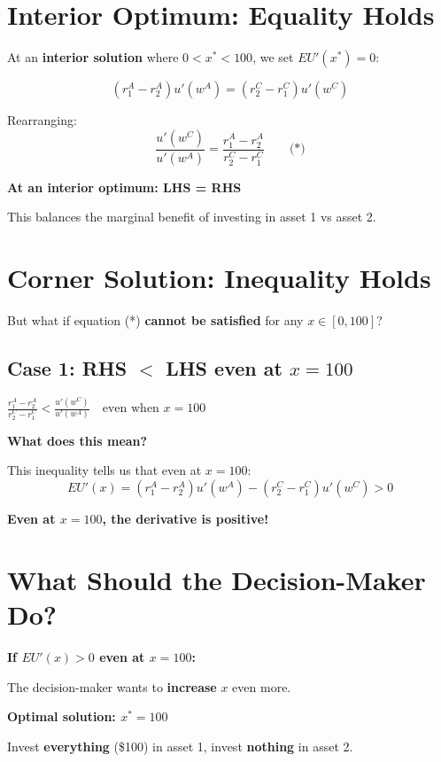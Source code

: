 \documentclass[12pt]{article}
\begin{document}
\section*{Interior Optimum: Equality Holds}

At an \textbf{interior solution} where $0 < x^* < 100$, we set $EU'(x^*) = 0$:

$$(r_1^A - r_2^A)u'(w^A) = (r_2^C - r_1^C)u'(w^C)$$

Rearranging:
$$\frac{u'(w^C)}{u'(w^A)} = \frac{r_1^A - r_2^A}{r_2^C - r_1^C} \qquad \text{(*)}$$

\begin{center}
\colorbox{green!20}{
\begin{minipage}{0.9\textwidth}
\textbf{At an interior optimum: LHS = RHS}

This balances the marginal benefit of investing in asset 1 vs asset 2.
\end{minipage}
}
\end{center}

\section*{Corner Solution: Inequality Holds}

But what if equation (*) \textbf{cannot be satisfied} for any $x \in [0, 100]$?

\subsection*{Case 1: RHS $<$ LHS even at $x = 100$}

\begin{center}
\colorbox{red!20}{\Large
$\displaystyle\frac{r_1^A - r_2^A}{r_2^C - r_1^C} < \frac{u'(w^C)}{u'(w^A)} \quad \text{even when } x = 100$
}
\end{center}

\textbf{What does this mean?}

This inequality tells us that even at $x = 100$:
$$EU'(x) = (r_1^A - r_2^A)u'(w^A) - (r_2^C - r_1^C)u'(w^C) > 0$$

\textbf{Even at $x = 100$, the derivative is positive!}

\newpage

\section*{What Should the Decision-Maker Do?}

\begin{center}
\colorbox{blue!20}{
\begin{minipage}{0.9\textwidth}
\textbf{If $EU'(x) > 0$ even at $x = 100$:}

The decision-maker wants to \textbf{increase} $x$ even more.

\textbf{Optimal solution: $x^* = 100$}

Invest \textbf{everything} (\$100) in asset 1, invest \textbf{nothing} in asset 2.
\end{minipage}
}
\end{center}
\end{document}
